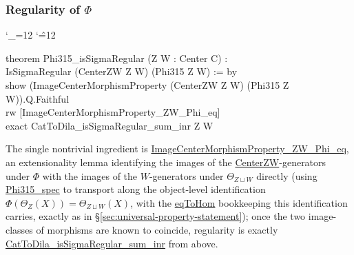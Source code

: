 \documentclass[11pt]{amsart}
\newcommand{\lc}[1]{\url{#1}}
\newenvironment{leancode}{%
  \begingroup
  \catcode`\_=12\relax
  \catcode`\^=12\relax
  \small\ttfamily\raggedright\baselineskip=1.15\baselineskip
  \par\smallskip\noindent
}{%
  \par\smallskip
  \endgroup
}
\theoremstyle{plain}
\theoremstyle{definition}
\theoremstyle{remark}
\begin{document}
\subsubsection*{Regularity of $\Phi$}
\begin{leancode}
theorem Phi315_isSigmaRegular (Z W : Center C) : \\
    IsSigmaRegular (CenterZW Z W) (Phi315 Z W) := by \\
  show (ImageCenterMorphismProperty (CenterZW Z W) (Phi315 Z W)).Q.Faithful \\
  rw [ImageCenterMorphismProperty_ZW_Phi_eq] \\
  exact CatToDila_isSigmaRegular_sum_inr Z W \\
\end{leancode}
The single nontrivial ingredient is \lc{ImageCenterMorphismProperty_ZW_Phi_eq}, an
extensionality lemma identifying the images of the \lc{CenterZW}-generators under $\Phi$
with the images of the $W$-generators under $\Theta_{Z\sqcup W}$ directly (using
\lc{Phi315_spec} to transport along the object-level identification $\Phi(\Theta_Z(X)) =
\Theta_{Z\sqcup W}(X)$, with the \lc{eqToHom} bookkeeping this identification carries,
exactly as in \S\ref{sec:universal-property-statement}); once the two image-classes of
morphisms are known to coincide, regularity is exactly
\lc{CatToDila_isSigmaRegular_sum_inr} from above.
\end{document}
